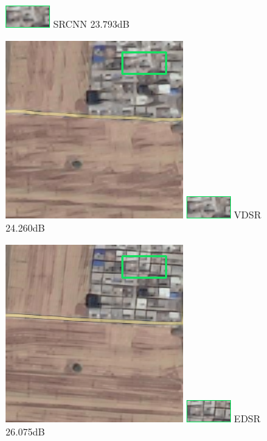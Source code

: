\documentclass[runningheads,a4paper]{llncs}
\begin{document}
\begin{figure}[htbp]
\begin{minipage}{1.4cm}
    \includegraphics[scale=0.8]{pic/4x/srcnn/small-35.png}
    {SRCNN \newline23.793dB}
    \end{minipage}
    \qquad
    \begin{minipage}{1.3cm}
     \includegraphics[scale=0.2]{pic/4x/vdsr/pick-35.png}
    \includegraphics[scale=0.8]{pic/4x/vdsr/small-35.png}
    {VDSR \newline24.260dB}
    \end{minipage}
    \qquad
    \begin{minipage}{1.3cm}
     \includegraphics[scale=0.2]{pic/4x/edsr/pick-35.png}
    \includegraphics[scale=0.8]{pic/4x/edsr/small-35.png}
    {EDSR \newline 26.075dB }
    \end{minipage}
    \qquad
    \begin{minipage}{1.3cm}

\end{minipage}
\end{figure}
\end{document}
